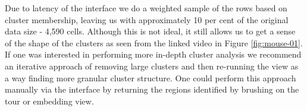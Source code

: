 \documentclass[article,notitle]{jdssv}
\begin{document}
Due to latency of the  interface we do a weighted sample of the rows based on
cluster membership, leaving us with approximately 10 per cent of the original
data size - 4,590 cells. Although this is not ideal, it still allows us to
get a sense of the shape of the clusters as seen from the linked video in Figure \ref{fig:mouse-01}. If one was interested in performing more in-depth cluster analysis we recommend an iterative approach of removing large clusters and then re-running the  view as a way finding more granular cluster structure. One could perform this approach manually via the  interface by returning the regions identified by brushing on the tour or embedding view.



\begin{figure}


\end{figure}
\end{document}

